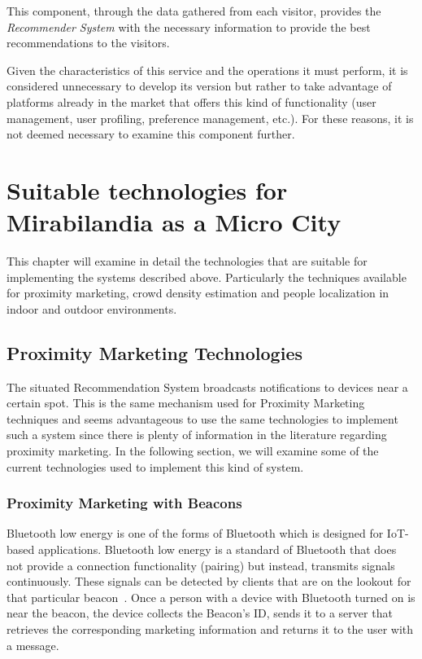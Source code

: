 This component, through the data gathered from each visitor, provides the \textit{Recommender System} with the necessary information to provide the
best recommendations to the visitors.

Given the characteristics of this service and the operations it must perform, it is considered unnecessary to develop its version but rather to take
advantage of platforms already in the market that offers this kind of functionality (user management, user profiling, preference management, etc.).
For these reasons, it is not deemed necessary to examine this component further.

\section{Suitable technologies for Mirabilandia as a Micro City}
This chapter will examine in detail the technologies that are suitable for implementing the systems described above.
Particularly the techniques available for proximity marketing, crowd density estimation and people localization in indoor and outdoor environments.

\subsection{Proximity Marketing Technologies}\label{sec:proximity-marketing-technologies}
The situated Recommendation System broadcasts notifications to devices near a certain spot.
This is the same mechanism used for Proximity Marketing techniques and seems advantageous to use the same technologies to implement such a system since there is plenty of information in the literature regarding proximity marketing.
In the following section, we will examine some of the current technologies used to implement this kind of system.

\subsubsection{Proximity Marketing with Beacons}\label{sec:proximity-marketing-with-beacons}
Bluetooth low energy is one of the forms of Bluetooth which is designed for IoT-based applications. 
Bluetooth low energy is a standard of Bluetooth that does not provide a connection functionality (pairing) but instead, transmits signals continuously.
These signals can be detected by clients that are on the lookout for that particular beacon~\cite{muddinagiri2020implementation}.
Once a person with a device with Bluetooth turned on is near the beacon, the device collects the Beacon's ID, sends it to a server that retrieves the corresponding marketing information and returns it to the user with a message.

